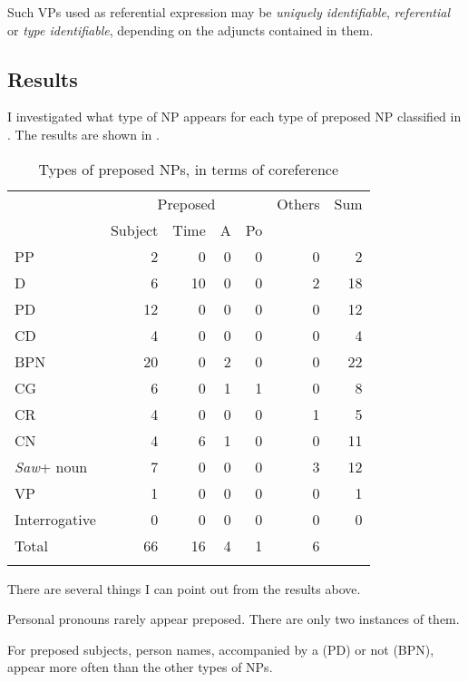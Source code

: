 \documentclass[output=paper
,modfonts
,nonflat]{langsci/langscibook}
\begin{document}
\noindent
Such VPs used as referential expression may be \textit{uniquely identifiable}, \textit{referential} or \textit{type identifiable}, depending on the adjuncts contained in them.

\subsection{\label{s:tsukida:3.2}Results}

I investigated what type of NP appears for each type of preposed NP classified in . The results are shown in .

\begin{table}[h]
\begin{tabularx}{\textwidth}{Xrrrrrr}
	\lsptoprule
	& \multicolumn{4}{c}{Preposed} &  Others &  Sum\\ \cmidrule{2-5}
	&  Subject &  Time &  A &  Po &  & \\ 
	\midrule
	 PP &  2 &  0 &  0 &  0 &  0 &  2\\
	 D &  6 &  10 &  0 &  0 &  2 &  18\\
	 PD &  12 &  0 &  0 &  0 &  0 &  12\\
	 CD &  4 &  0 &  0 &  0 &  0 &  4\\
	 BPN &  20 &  0 &  2 &  0 &  0 &  22\\
	 CG &  6 &  0 &  1 &  1 &  0 &  8\\
	 CR &  4 &  0 &  0 &  0 &  1 &  5\\
	 CN &  4 &  6 &  1 &  0 &  0 &  11\\
	 \textit{Saw}+ noun &  7 &  0 &  0 &  0 &  3 &  12\\
	 VP &  1 &  0 &  0 &  0 &  0 &  1\\
	 Interrogative &  0 &  0 &  0 &  0 &  0 &  0\\
	 \midrule
	 Total &  66 &  16 &  4 &  1 &  6 & \\
	\lspbottomrule
\end{tabularx}
	\caption{Types of preposed NPs, in terms of coreference}
	\label{tab:tsukida:3}
\end{table}

There are several things I can point out from the results above. 

Personal pronouns rarely appear preposed. There are only two instances of them.

For preposed subjects, person names, accompanied by a  (PD) or not (BPN), appear more often than the other types of NPs. 
\end{document}
